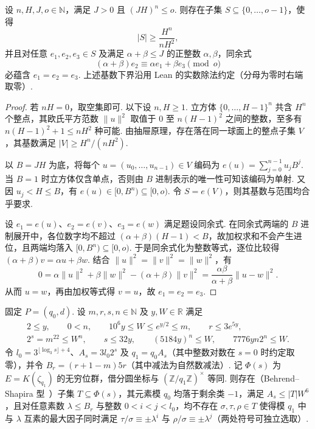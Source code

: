 \begin{lemma}
\label{lem:behrend-exponents}
\emitthmsource
设 $n,H,J,o\in\mathbb N$，满足 $J>0$ 且 $(JH)^n\le o$. 则存在子集 $S\subseteq\{0,\ldots,o-1\}$，使得
\[
 |S|\ge\frac{H^n}{nH^2},
\]
并且对任意 $e_1,e_2,e_3\in S$ 及满足 $\alpha+\beta\le J$ 的正整数 $\alpha,\beta$，同余式
\[
 (\alpha+\beta)e_2\equiv\alpha e_1+\beta e_3\pmod o
\]
必蕴含 $e_1=e_2=e_3$. 上述基数下界沿用 Lean 的实数除法约定（分母为零时右端取零）.
\end{lemma}

\begin{proof}
若 $nH=0$，取空集即可. 以下设 $n,H\ge1$. 立方体 $\{0,\ldots,H-1\}^n$ 共含 $H^n$ 个整点，其欧氏平方范数 $\|u\|^2$ 取值于 $0$ 至 $n(H-1)^2$ 之间的整数，至多有 $n(H-1)^2+1\le nH^2$ 种可能.
由抽屉原理，存在落在同一球面上的整点子集 $V$，其基数满足 $|V|\ge H^n/(nH^2)$.

以 $B=JH$ 为底，将每个 $u=(u_0,\ldots,u_{n-1})\in V$ 编码为
$e(u)=\sum_{j=0}^{n-1}u_j B^j$. 当 $B=1$ 时立方体仅含单点，否则由 $B$ 进制表示的唯一性可知该编码为单射.
又因 $u_j<H\le B$，有 $e(u)\in[0,B^n)\subseteq[0,o)$. 令 $S=e(V)$，则其基数与范围均合乎要求.

设 $e_1=e(u)$、$e_2=e(v)$、$e_3=e(w)$ 满足题设同余式. 在同余式两端的 $B$ 进制展开中，各位数字均不超过
$(\alpha+\beta)(H-1)<B$，故加权求和不会产生进位，且两端均落入 $[0,B^n)\subseteq[0,o)$.
于是同余式化为整数等式，逐位比较得 $(\alpha+\beta)v=\alpha u+\beta w$.
结合 $\|u\|^2=\|v\|^2=\|w\|^2$，有
\[
 0
 =\alpha\|u\|^2+\beta\|w\|^2-(\alpha+\beta)\|v\|^2
 =\frac{\alpha\beta}{\alpha+\beta}\|u-w\|^2 .
\]
从而 $u=w$，再由加权等式得 $v=u$，故 $e_1=e_2=e_3$.
\end{proof}

\begin{lemma}[由秩和尺度参数构造稀疏位集]
\label{lem:sparse-places-ranks}
\emitthmsource
固定 $P=(q_0,d)$. 设 $m,r,s,n\in\mathbb N$ 及 $y,W\in\mathbb R$ 满足
\[
\begin{gathered}
 2\le y,\qquad 0<n,\qquad 10^6 y\le W\le e^{y/2}\le m,\qquad
 r\le 3 e^{5y},\\
 2^s=m^{22}\le W^n,\qquad s\le32y,\qquad
 (5184y)^n\le W,\qquad 7776yn2^n\le W .
\end{gathered}
\]
令 $l_0=3^{\lfloor\log_3 s\rfloor+4}$、$A_s=3l_0 2^s$ 及 $q_1=q_0A_s$（其中整数对数在 $s=0$ 时约定取零），并令 $B_r=(r+1-m)5r$（其中减法为自然数减法）.
记 $\Phi(s)$ 为 $E=K(\zeta_{q_1})$ 的无穷位群，借分圆坐标与 $(\mathbb Z/q_1\mathbb Z)^\times$ 等同. 则存在（Behrend--Shapira 型~\cite{Behrend1946,Shapira2006}）子集 $T\subseteq\Phi(s)$，其元素模 $q_0$ 均落于剩余类 $-1$，满足 $A_s\le|T|W^6$，且对任意素数 $\lambda\le B_r$ 与整数 $0<i<j<l_0$，均不存在 $\sigma,\tau,\rho\in T$ 使得模 $q_1$ 中与 $\lambda$ 互素的最大因子同时满足 $\tau/\sigma\equiv\pm\lambda^i$ 与 $\rho/\sigma\equiv\pm\lambda^j$（两处符号可独立选取）.
\end{lemma}

